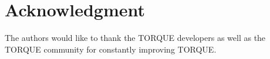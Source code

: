 \section*{Acknowledgment}

The authors would like to thank the TORQUE developers as well as the TORQUE
community for constantly improving TORQUE.
